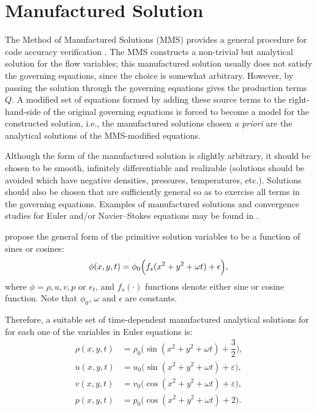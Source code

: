 \documentclass[10pt]{article}
\begin{document}
\section{Manufactured Solution}
The Method of Manufactured Solutions (MMS) provides a general procedure for  code accuracy verification \citep{Roache2002,Bond2007}. %
%
The MMS constructs a non-trivial but analytical solution for the flow variables; this manufactured
solution usually does not  satisfy the governing equations, since the choice is somewhat arbitrary. However, by passing the solution through the governing equations gives the production terms $Q$. A modified set of equations formed by adding these source terms to the right-hand-side of the original governing equations is forced to become a model for the constructed solution, i.e., the manufactured solutions chosen \textit{a priori} are the analytical solutions of the MMS-modified equations.

Although the form of the manufactured solution is slightly arbitrary, it should be chosen to be smooth, infinitely differentiable and realizable (solutions should be avoided which have negative densities, pressures, temperatures, etc.)\citep{Salari_Knupp_2000,Roy2004}. Solutions should also be chosen that are sufficiently general so as to exercise all terms in the governing equations. Examples of manufactured solutions and convergence studies for Euler and/or Navier--Stokes equations may be found in \citet{Salari_Knupp_2000,Roy2002,Roy2004,Bond2007,Orozco2010}.

\citet{Salari_Knupp_2000} propose the general form of the primitive solution variables to be  a function of sines or cosines:
\begin{equation}
 \label{eq:manufactured01}
  \phi (x,y,t) = \phi_{0} \Big( f_s(x^2+y^2+\omega t) + \epsilon\Big) ,\\
\end{equation}
where $\phi=\rho,u,v, p$ or $e_t$, and $f_s(\cdot)$ functions denote either sine or cosine function. Note that $\phi_0$, $\omega$ and $\epsilon$ are constants.

Therefore, a suitable set of time-dependent manufactured analytical solutions for for each one of the variables in Euler equations is:
\begin{equation}
\begin{split}
\label{eq:manufactured02}
\rho(x,y,t) &=  \rho_{0} \Big( \sin(x^2+y^2+\omega t) + \dfrac{3}{2}\Big) ,\\
u(x,y,t) &= u_{0} \Big( \sin(x^2+y^2+\omega t) + \varepsilon \Big) ,\\
v(x,y,t) &= v_{0} \Big( \cos(x^2+y^2+\omega t) + \varepsilon \Big) ,\\
p(x,y,t) &= p_{0} \Big( \cos(x^2+y^2+\omega t) + 2\Big) .
\end{split}
\end{equation}
\end{document}
